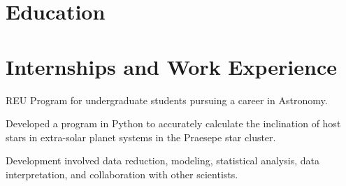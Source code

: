 \documentclass[]{deedy-resume-openfont}
\begin{document}
%
%

%
%






\begin{minipage}[t]{0.9\textwidth} 




\section{Education} 

\sectionsep


\section{Internships and Work Experience}

\vspace{\topsep} %
\begin{tightemize} \item REU Program for undergraduate students pursuing a career in Astronomy.\item Developed a program in Python to accurately calculate the inclination of host stars in extra-solar planet systems in the Praesepe star cluster. \item Development involved data reduction, modeling, statistical analysis, data interpretation, and collaboration with other scientists. 
\end{tightemize}
\sectionsep


\end{minipage}
\end{document}
